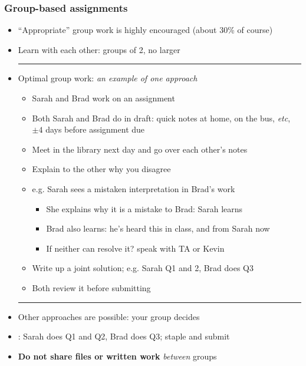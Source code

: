 \begin{frame}\frametitle{Group-based assignments}
	\begin{itemize}
		\item	``Appropriate'' group work is highly encouraged (about 30\% of course)
		\item	Learn with each other: groups of 2, no larger
		\vspace{2pt}\hrule\vspace{2pt}
		\item	Optimal group work: \emph{an example of one approach}
			\begin{itemize}
				\item	Sarah and Brad work on an assignment
				\item	Both Sarah and Brad do {} in draft: quick notes at home, on the bus, \emph{etc}, $\pm 4$ days before assignment due
				\pause
				\item	Meet in the library next day and go over each other's notes
				\item	Explain to the other why you disagree
				\item	e.g. Sarah sees a mistaken interpretation in Brad's work
				\begin{itemize}
					\item	She explains why it is a mistake to Brad: Sarah learns
					\item	Brad also learns: he's heard this in class, and from Sarah now
					\item	If neither can resolve it? speak with TA or Kevin
				\end{itemize}
				\pause
				\item	Write up a joint solution; e.g. Sarah Q1 and 2, Brad does Q3
				\item	Both review it before submitting
			\end{itemize}
		\vspace{2pt}\hrule\vspace{2pt}
		\pause
		\item	Other approaches are possible: your group decides
		\item	\color{myOrange}{What doesn't work}: Sarah does Q1 and Q2, Brad does Q3; staple and submit
		\item	\textbf{Do not share files or written work} \emph{between} groups
	\end{itemize}
\end{frame}

